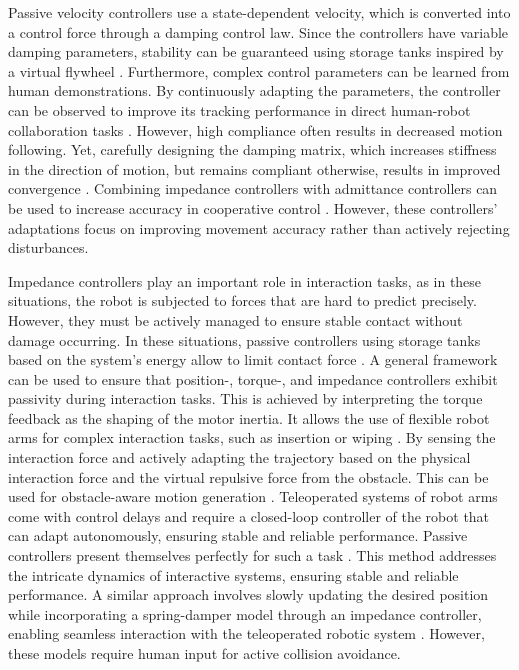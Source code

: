 Passive velocity controllers use a state-dependent velocity, which is converted into a control force through a damping control law. Since the controllers have variable damping parameters, stability can be guaranteed using storage tanks inspired by a virtual flywheel \parencite{li1999passive}. 
Furthermore, complex control parameters can be learned from human demonstrations. By continuously adapting the parameters, the controller can be observed to improve its tracking performance in direct human-robot collaboration tasks \parencite{gribovskaya2011motion}.
However, high compliance often results in decreased motion following. Yet, carefully designing the damping matrix, which increases stiffness in the direction of motion, but remains compliant otherwise, results in improved convergence \parencite{kronander2015passive}. 
Combining impedance controllers with admittance controllers can be used to increase accuracy in cooperative control
\parencite{fujiki2022series}.
However, these controllers' adaptations focus on improving movement accuracy rather than actively rejecting disturbances.

Impedance controllers play an important role in interaction tasks, as in these situations, the robot is subjected to forces that are hard to predict precisely. However, they must be actively managed to ensure stable contact without damage occurring. In these situations, passive controllers using storage tanks based on the system's energy allow to limit contact force \parencite{kishi2003passive}.
A general framework can be used to ensure that position-, torque-, and impedance controllers exhibit passivity during interaction tasks. This is achieved by interpreting the torque feedback as the shaping of the motor inertia. It allows the use of flexible robot arms for complex interaction tasks, such as insertion or wiping \parencite{albu2007unified}. 
By sensing the interaction force and actively adapting the trajectory based on the physical interaction force and the virtual repulsive force from the obstacle. This can be used for obstacle-aware motion generation \parencite{haddadin2010real}.
Teleoperated systems of robot arms come with control delays and require a closed-loop controller of the robot that can adapt autonomously, ensuring stable and reliable performance. Passive controllers present themselves perfectly for such a task  \parencite{stramigioli2005sampled}. This method addresses the intricate dynamics of interactive systems, ensuring stable and reliable performance.
A similar approach involves slowly updating the desired position while incorporating a spring-damper model through an impedance controller, enabling seamless interaction with the teleoperated robotic system \parencite{lee2010passive}.
However, these models require human input for active collision avoidance.

